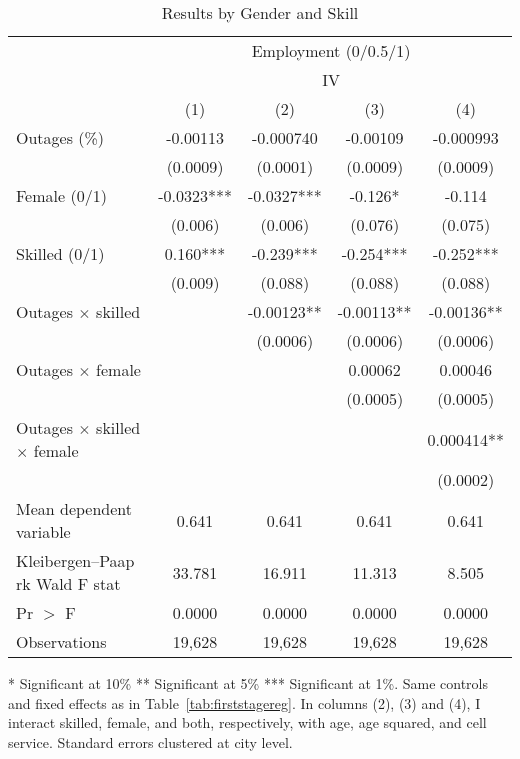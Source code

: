 \documentclass[12pt]{article}
\begin{document}
\begin{table}[!htbp]
\centering
\footnotesize
\caption{Results by Gender and Skill}
\label{tab:by skill}
\label{tab:skill}
\begin{tabular}{lcccc}
\hline\hline
& \multicolumn{4}{c}{Employment (0/0.5/1)} \\
\cmidrule(lr){2-5}
& \multicolumn{4}{c}{IV} \\
 & (1) & (2) & (3) & (4)\\
\midrule
Outages (\%)
  & -0.00113
  & -0.000740
  &  -0.00109
  & -0.000993 \\
  & (0.0009)
  & (0.0001)
  & (0.0009)
  & (0.0009)\\[3pt]
Female (0/1)
  & -0.0323***
  & -0.0327***
  &  -0.126*
  & -0.114\\
  & (0.006)
  & (0.006)
  & (0.076)
  & (0.075)\\[3pt]
Skilled (0/1)
  & 0.160***
  & -0.239***
  & -0.254***
  & -0.252***\\
  & (0.009)
  & (0.088)
  & (0.088)
  & (0.088)\\[3pt]
Outages $\times$ skilled
  & 
  & -0.00123**
  & -0.00113** 
  & -0.00136** \\
  & 
  & (0.0006)
  & (0.0006)
  & (0.0006)\\[3pt]
Outages $\times$ female
  & 
  & 
  & 0.00062
  & 0.00046 \\
  & 
  & 
  & (0.0005)
  & (0.0005)\\[3pt]
Outages $\times$ skilled $\times$ female
  & 
  & 
  & 
  & 0.000414** \\
  & 
  & 
  & 
  & (0.0002)\\[3pt]
\midrule
Mean dependent variable
  & 0.641 
  &  0.641  
  & 0.641 
  & 0.641 \\
Kleibergen--Paap rk Wald F stat
  & 33.781 & 16.911  & 11.313 
  & 8.505 \\
Pr $>$ F & 0.0000 & 0.0000 & 0.0000 & 0.0000 \\
Observations 
  & 19,628  & 19,628 & 19,628 & 19,628\\
\midrule
\bottomrule
\end{tabular}
\end{table}
\begin{flushleft}
\footnotesize
* Significant at 10\% ** Significant at 5\% *** Significant at 1\%. Same controls and fixed effects as in Table~\ref{tab:firststagereg}. In columns (2), (3) and (4), I interact skilled, female, and both, respectively, with  age, age squared, and cell service. Standard errors clustered at city level.
\end{flushleft}
\par
\end{document}
